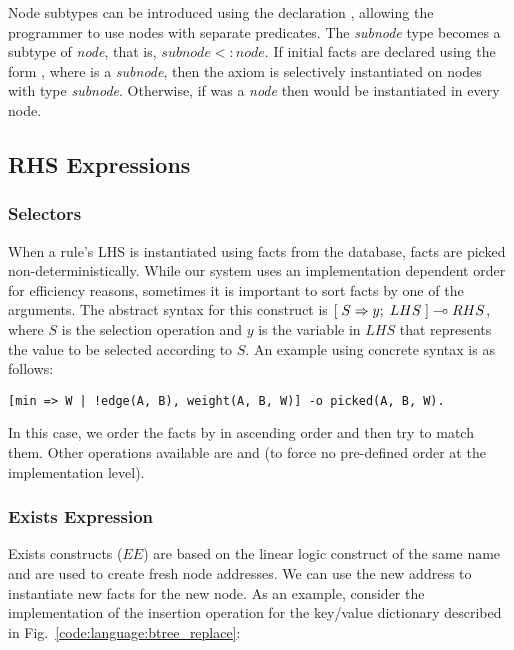 Node subtypes can be introduced using the declaration ,
allowing the programmer to use nodes with separate predicates.  The
\emph{subnode} type becomes a subtype of \emph{node}, that is, $subnode <:
node$. If initial facts are declared using the form , where  is a
\emph{subnode}, then the axiom is selectively instantiated on nodes with type
\emph{subnode}. Otherwise, if  was a \emph{node} then  would
be instantiated in every node.

\subsection{RHS Expressions}\label{section:language:expressions}

\subsubsection{Selectors}

When a rule's LHS is instantiated using facts from the database, facts are
picked non-deterministically. While our system uses an implementation dependent
order for efficiency reasons, sometimes it is important to sort facts by one of
the arguments. The abstract syntax for this construct is
$[\; S \Rightarrow y; \; LHS \;] \multimap RHS$, where $S$ is the selection operation and $y$ is the
variable in $LHS$ that represents the value to be selected according to $S$. An
example using concrete syntax is as follows:

\begin{Verbatim}[fontsize=\codesize]
[min => W | !edge(A, B), weight(A, B, W)] -o picked(A, B, W).
\end{Verbatim}

In this case, we order the  facts by  in ascending order
and then try to match them. Other operations available are  and
 (to force no pre-defined order at the implementation level).

\subsubsection{Exists Expression}

Exists constructs ($EE$) are based on the linear logic construct of the same name
and are used to create fresh node addresses. We can use the new address to
instantiate new facts for the new node. As an example, consider the implementation of the
insertion operation for the key/value dictionary described in
Fig.~\ref{code:language:btree_replace}:

